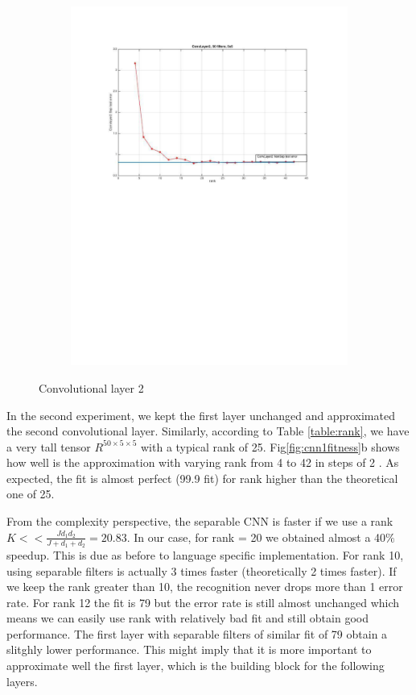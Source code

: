 \documentclass{article} %
\begin{document}
\begin{figure}[h]
\begin{subfigure}[b]{0.40\textwidth}
    \includegraphics[width=\textwidth]{images/imagesCNN_page1.pdf}
    \caption{}
  \end{subfigure}
  \caption{Convolutional layer 2}
  \label{fig:cnn1error}
\end{figure}

In the second experiment, we kept the first layer unchanged and approximated the second convolutional layer.
Similarly, according to Table \ref{table:rank}, we have a very tall tensor $R^{50\times 5 \times 5}$ with a typical rank of 25.
Fig\ref{fig:cnn1fitness}b shows how well is the approximation with varying rank from 4 to 42 in steps of 2 . As expected, the fit is almost perfect (99.9 fit) for rank higher than the theoretical one of 25.

From the complexity perspective, the separable CNN is faster if we use a rank $K << \frac{Jd_{1}d_{2}}{J +d_{1}+d_{2}} = 20.83$. In our case, for rank = 20 we obtained almost a 40$\%$ speedup. This is due as before to language specific implementation.
For rank 10, using separable filters is actually 3 times faster (theoretically 2 times faster).
If we keep the rank greater than 10, the recognition never drops more than 1 error rate.
For rank 12 the fit is 79 but the error rate is still almost unchanged which means we can easily use rank with relatively bad fit and still obtain good performance. The first layer with separable filters of similar fit of 79 obtain a slitghly lower performance. This might imply that it is more important to approximate well the first layer, which is the building block for the following layers.
\end{document}
